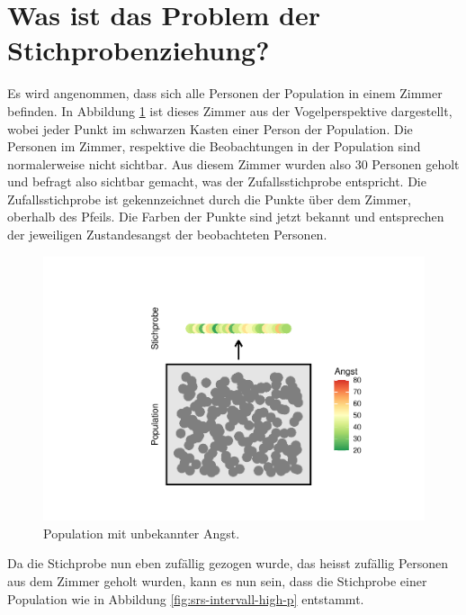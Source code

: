 \documentclass[
]{book}
\theoremstyle{definition}
\theoremstyle{definition}
\theoremstyle{definition}
\theoremstyle{definition}
\theoremstyle{remark}
\begin{document}
\section{Was ist das Problem der Stichprobenziehung?}\label{stichprobenziehung-problem}

Es wird angenommen, dass sich alle Personen der Population in einem Zimmer befinden. In Abbildung \ref{fig:srs-intervall-nocol} ist dieses Zimmer aus der Vogelperspektive dargestellt, wobei jeder Punkt im schwarzen Kasten einer Person der Population. Die Personen im Zimmer, respektive die Beobachtungen in der Population sind normalerweise nicht sichtbar. Aus diesem Zimmer wurden also 30 Personen geholt und befragt also sichtbar gemacht, was der Zufallsstichprobe entspricht. Die Zufallsstichprobe ist gekennzeichnet durch die Punkte über dem Zimmer, oberhalb des Pfeils. Die Farben der Punkte sind jetzt bekannt und entsprechen der jeweiligen Zustandesangst der beobachteten Personen.

\begin{figure}
\centering
\includegraphics{aps_statistik1_files/figure-latex/srs-intervall-nocol-1.pdf}
\caption{\label{fig:srs-intervall-nocol}Population mit unbekannter Angst.}
\end{figure}

Da die Stichprobe nun eben zufällig gezogen wurde, das heisst zufällig Personen aus dem Zimmer geholt wurden, kann es nun sein, dass die Stichprobe einer Population wie in Abbildung \ref{fig:srs-intervall-high-p} entstammt.
\end{document}
